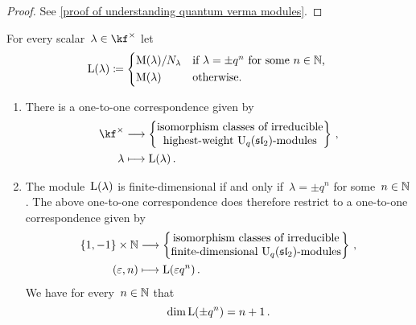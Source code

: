 \documentclass[a4paper, 11pt, oneside]{scrartcl}
\begin{document}
\begin{proof}
  See \cref{proof of understanding quantum verma modules}.
\end{proof}

\begin{definition}
  For every scalar~$\lambda \in \kf^\times$ let
  \[
    \irred(\lambda)
    \defined
    \begin{cases*}
        \verma(\lambda) / N_\lambda
        &
        if~$\lambda = \pm q^n$ for some~$n \in \Natural$,
        \\
        \verma(\lambda)
        &
        otherwise.
    \end{cases*}
  \]
\end{definition}

\begin{theorem}
  \label{classification of Uqsl2 modules}
  \leavevmode
  \begin{enumerate}
    \item
      There is a one-to-one correspondence given by
      \begin{align*}
        \kf^\times
        &\longto
        \left\{
          \begin{tabular}{@{}c@{}}
            isomorphism classes of irreducible \\
            highest-weight~\modules{$\Univ_q(\sllie_2)$}
          \end{tabular}
        \right\} \,,
        \\
        \lambda
        &\longmapsto
        \irred(\lambda) \,.
      \end{align*}
    \item
      The module~$\operatorname{L}(\lambda)$ is finite-dimensional if and only if~$\lambda = \pm q^n$ for some~$n \in \mathbb{N}$.
      The above one-to-one correspondence does therefore restrict to a one-to-one correspondence given by
      \begin{align*}
        \{ 1, -1 \} \times \Natural
        &\longto
        \left\{
          \begin{tabular}{@{}c@{}}
            isomorphism classes of irreducible \\
            finite-dimensional~\modules{$\Univ_q(\sllie_2)$}
          \end{tabular}
        \right\} \,,
        \\
        (\varepsilon, n)
        &\longmapsto
        \irred(\varepsilon q^n) \,.
      \end{align*}
      We have for every~$n \in \mathbb{N}$ that
      \[
        \dim \operatorname{L}(\pm q^n)
        =
        n + 1 \,.
      \]
  \end{enumerate}
\end{theorem}
\end{document}
